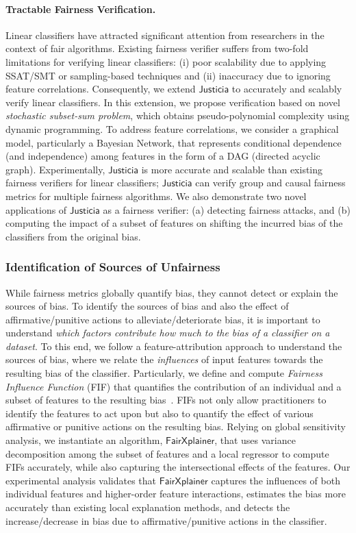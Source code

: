 \documentclass[11pt]{article}
\begin{document}
	\paragraph{Tractable Fairness Verification.} Linear classifiers have attracted significant attention from researchers in the context of fair algorithms. Existing fairness verifier suffers from two-fold limitations for verifying linear classifiers: (i) poor scalability due to applying SSAT/SMT or sampling-based techniques and (ii) inaccuracy due to ignoring feature correlations. Consequently, we extend $ \mathsf{Justicia} $ to accurately and scalably verify linear classifiers. In this extension, we propose verification based on novel \textit{stochastic subset-sum problem}, which obtains pseudo-polynomial complexity using dynamic programming. To address feature correlations, we consider a graphical model, particularly a Bayesian Network, that represents conditional dependence (and independence) among features in the form of a DAG (directed acyclic graph). Experimentally,  $ \mathsf{Justicia} $ is more accurate and scalable than existing fairness verifiers for linear classifiers; $ \mathsf{Justicia} $ can verify group and causal fairness metrics for multiple fairness algorithms. We also demonstrate two novel applications of $ \mathsf{Justicia} $ as a fairness verifier: (a) detecting fairness attacks, and (b) computing the impact of a subset of features on shifting the incurred bias of the classifiers from the original bias.
	
	
	
	
	
	
	\subsubsection*{Identification of Sources of Unfairness}
	While fairness metrics globally quantify bias, they cannot detect or explain the sources of bias. To identify the sources of bias and also the effect of affirmative/punitive actions to alleviate/deteriorate bias, it is important to understand \textit{which factors contribute how much to the bias of a classifier on a dataset}. To this end, we follow a feature-attribution approach to understand the sources of bias, where we relate the \emph{influences} of input features towards the resulting bias of the classifier. Particularly, we define and compute \textit{Fairness Influence Function} (FIF) that quantifies the contribution of an individual and a subset of features to the resulting bias~\cite{ghosh2022how}. FIFs not only allow practitioners to identify the features to act upon but also to quantify the effect of various affirmative or punitive actions on the resulting bias. Relying on global sensitivity analysis, we instantiate an algorithm, $ \mathsf{FairXplainer} $, that uses variance decomposition among the subset of features and a local regressor to compute FIFs accurately, while also capturing the intersectional effects of the features. Our experimental analysis validates that $ \mathsf{FairXplainer} $ captures the influences of both individual features and higher-order feature interactions, estimates the bias more accurately than existing local explanation methods, and detects the increase/decrease in bias due to affirmative/punitive actions in the classifier.
	
\end{document}
